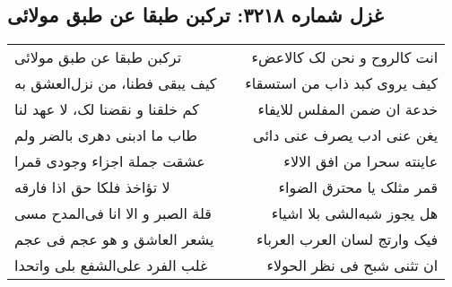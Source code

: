 \begin{center}
\section*{غزل شماره ۳۲۱۸: ترکبن طبقا عن طبق مولائی}
\label{sec:3218}
\begin{longtable}{l p{0.5cm} r}
ترکبن طبقا عن طبق مولائی
&&
انت کالروح و نحن لک کالاعضء
\\
کیف یبقی فطنا، من نزل‌العشق به
&&
کیف یروی کبد ذاب من استسقاء
\\
کم خلقنا و نقضنا لک، لا عهد لنا
&&
خدعة ان ضمن المفلس للایفاء
\\
طاب ما ادبنی دهری بالضر ولم
&&
یغن عنی ادب یصرف عنی دائی
\\
عشقت جملة اجزاء وجودی قمرا
&&
عاینته سحرا من افق الالاء
\\
لا تؤاخذ فلکا حق اذا فارقه
&&
قمر مثلک یا محترق الضواء
\\
قلة الصبر و الا انا فی‌المدح مسی
&&
هل یجوز شبه‌الشی بلا اشیاء
\\
یشعر العاشق و هو عجم فی عجم
&&
فیک وارتج لسان العرب العرباء
\\
غلب الفرد علی‌الشفع بلی واتحدا
&&
ان تثنی شبح فی نظر الحولاء
\\
\end{longtable}
\end{center}
